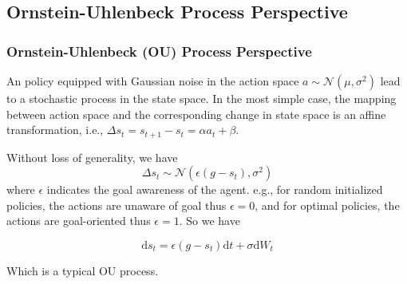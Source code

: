 \documentclass[10pt,hyperref={CJKbookmarks=true},envcountsect,mathserif]{beamer}
\begin{document}
%

\begin{frame}
\subsection{Ornstein-Uhlenbeck Process Perspective}
	\frametitle{Ornstein-Uhlenbeck (OU) Process Perspective}
	An policy equipped with Gaussian noise in the action space $a\sim \mathcal{N}(\mu, \sigma^2)$ lead to a stochastic process in the state space. In the most simple case, the mapping between action space and the corresponding change in state space is an affine transformation, i.e., $\Delta s_t =  s_{t+1} - s_t = \alpha a_t + \beta $.
	
	Without loss of generality, we have
	\begin{equation}
		\Delta s_t \sim \mathcal{N}(\epsilon(g - s_t),\sigma^2)
	\end{equation}
	where $\epsilon$ indicates the goal awareness of the agent. e.g., for random initialized policies, the actions are unaware of goal thus $\epsilon = 0$, and for optimal policies, the actions are goal-oriented thus $\epsilon = 1$.
	So we have
	
	\begin{equation}
	\label{eq_ou}
		\mathrm{d} s_t = \epsilon (g-s_t) \mathrm{d}t + \sigma \mathrm{d}W_t
	\end{equation}
	
	Which is a typical OU process.
	
\end{frame}
\end{document}
